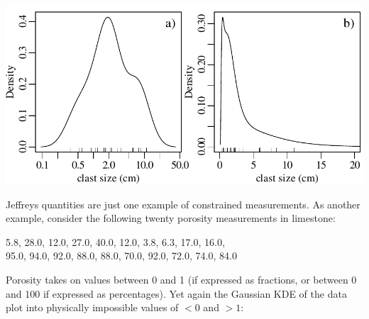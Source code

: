 \noindent\begin{minipage}[t][][b]{.6\textwidth}
  \includegraphics[width=\textwidth]{../figures/logKDE.pdf}\medskip
\end{minipage}
\begin{minipage}[t][][t]{.4\textwidth}
  \label{fig:logKDE}
\end{minipage}

Jeffreys quantities are just one example of constrained measurements.
As another example, consider the following twenty porosity
measurements in limestone:\medskip

\begin{center}
  5.8, 28.0, 12.0, 27.0, 40.0, 12.0, 3.8, 6.3, 17.0, 16.0,\\
  95.0, 94.0, 92.0, 88.0, 88.0, 70.0, 92.0, 72.0, 74.0, 84.0
\end{center}

Porosity takes on values between 0 and 1 (if expressed as fractions,
or between 0 and 100 if expressed as percentages). Yet again the
Gaussian KDE of the data plot into physically impossible values of
$<0$ and $>1$:\medskip

